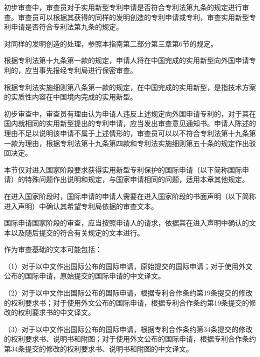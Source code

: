 初步审查中，审查员对于实用新型专利申请是否符合专利法第九条的规定进行审查。审查员可以根据其获得的同样的发明创造的专利申请或专利，审查实用新型专利申请是否符合专利法第九条的规定。

对同样的发明创造的处理，参照本指南第二部分第三章第6节的规定。

根据专利法第十九条第一款的规定，申请人将在中国完成的实用新型向外国申请专利的，应当事先报经专利局进行保密审查。

根据专利法实施细则第八条第一款的规定，在中国完成的实用新型，是指技术方案的实质性内容在中国境内完成的实用新型。

初步审查中，审查员有理由认为申请人违反上述规定向外国申请专利的，对于其在国内就相同的实用新型提出的专利申请，应当发出审查意见通知书。申请人陈述的理由不足以说明该申请不属于上述情形的，审查员可以以不符合专利法第十九条第一款为理由，根据专利法第十九条第四款和专利法实施细则第五十条的规定作出驳回决定。

本节仅对进入国家阶段要求获得实用新型专利保护的国际申请（以下简称国际申请）的特殊问题作出说明和规定，与国家申请相同的问题，适用本章其他规定。

在进入国家阶段时，国际申请的申请人需要在进入国家阶段的书面声明（以下简称进入声明）中确认其希望专利局依据的审查文本。

国际申请国家阶段的审查，应当按照申请人的请求，依据其在进入声明中确认的文本以及随后提交的符合有关规定的文本进行。

作为审查基础的文本可能包括：

{\setlength{\parindent}{17.1bp}（1）对于以中文作出国际公布的国际申请，原始提交的国际申请；对于使用外文公布的国际申请，原始提交的国际申请的中文译文。\par}

{\setlength{\parindent}{17.1bp}（2）对于以中文作出国际公布的国际申请，根据专利合作条约第19条提交的修改的权利要求书；对于使用外文公布的国际申请，根据专利合作条约第19条提交的修改的权利要求书的中文译文。\par}

{\setlength{\parindent}{17.1bp}（3）对于以中文作出国际公布的国际申请，根据专利合作条约第34条提交的修改的权利要求书、说明书和附图；对于使用外文公布的国际申请，根据专利合作条约第34条提交的修改的权利要求书、说明书和附图的中文译文。\par}

